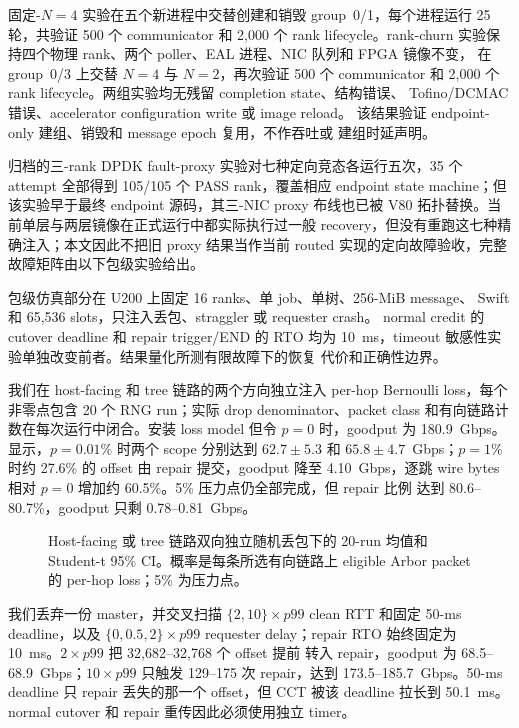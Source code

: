 固定-$N=4$ 实验在五个新进程中交替创建和销毁 group~0/1，每个进程运行
25 轮，共验证 500 个 communicator 和 2,000 个 rank lifecycle。rank-churn
实验保持四个物理 rank、两个 poller、EAL 进程、NIC 队列和 FPGA 镜像不变，
在 group~0/3 上交替 $N=4$ 与 $N=2$，再次验证 500 个 communicator 和
2,000 个 rank lifecycle。两组实验均无残留 completion state、结构错误、
Tofino/DCMAC 错误、accelerator configuration write 或 image reload。
该结果验证 endpoint-only 建组、销毁和 message epoch 复用，不作吞吐或
建组时延声明。

归档的三-rank DPDK fault-proxy 实验对七种定向竞态各运行五次，35 个
attempt 全部得到 105/105 个 PASS rank，覆盖相应 endpoint state
machine；但该实验早于最终 endpoint 源码，其三-NIC proxy 布线也已被
V80 拓扑替换。当前单层与两层镜像在正式运行中都实际执行过一般
recovery，但没有重跑这七种精确注入；本文因此不把旧 proxy 结果当作当前
routed 实现的定向故障验收，完整故障矩阵由以下包级实验给出。

包级仿真部分在 U200 上固定 16 ranks、单 job、单树、256-MiB message、
Swift 和 65,536 slots，只注入丢包、straggler 或 requester crash。
normal credit 的 cutover deadline 和 repair trigger/END 的 RTO 均为
10~ms，timeout 敏感性实验单独改变前者。结果量化所测有限故障下的恢复
代价和正确性边界。

我们在 host-facing 和 tree 链路的两个方向独立注入 per-hop Bernoulli
loss，每个非零点包含 20 个 RNG run；实际 drop denominator、packet
class 和有向链路计数在每次运行中闭合。安装 loss model 但令 $p=0$
时，goodput 为 180.9~Gbps。 显示，$p=0.01\%$ 时两个
scope 分别达到 $62.7\pm5.3$ 和 $65.8\pm4.7$~Gbps；$p=1\%$ 时约
27.6\% 的 offset 由 repair 提交，goodput 降至 4.10~Gbps，逐跳 wire
bytes 相对 $p=0$ 增加约 60.5\%。5\% 压力点仍全部完成，但 repair 比例
达到 80.6--80.7\%，goodput 只剩 0.78--0.81~Gbps。

\begin{figure}[t]
\centering

\caption{Host-facing 或 tree 链路双向独立随机丢包下的 20-run 均值和
Student-t 95\% CI。概率是每条所选有向链路上 eligible Arbor packet 的
per-hop loss；5\% 为压力点。}
\label{fig:loss}
\end{figure}

我们丢弃一份 master，并交叉扫描 $\{2,10\}\times p99$ clean RTT 和固定
50-ms deadline，以及 $\{0,0.5,2\}\times p99$ requester delay；repair
RTO 始终固定为 10~ms。$2\times p99$ 把 32,682--32,768 个 offset 提前
转入 repair，goodput 为 68.5--68.9~Gbps；$10\times p99$ 只触发
129--175 次 repair，达到 173.5--185.7~Gbps。50-ms deadline 只 repair
丢失的那一个 offset，但 CCT 被该 deadline 拉长到 50.1~ms。normal
cutover 和 repair 重传因此必须使用独立 timer。


